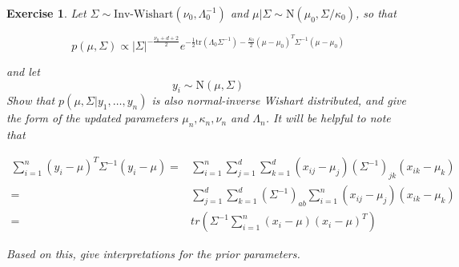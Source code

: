 \documentclass[twoside]{article}
\newcounter{lecnum}
\newtheorem{exercise}{Exercise}[lecnum]
\begin{document}
\begin{exercise}
  Let $\Sigma \sim \mbox{Inv-Wishart}(\nu_0, \Lambda_0^{-1})$ and $\mu|\Sigma \sim \mbox{N}(\mu_0, \Sigma/\kappa_0)$, so that

  $$p(\mu,\Sigma) \propto |\Sigma|^{-\frac{\nu_0+d+2}{2}}e^{-\frac{1}{2}\mbox{tr}(\Lambda_0\Sigma^{-1}) - \frac{\kappa_0}{2}(\mu-\mu_0)^T\Sigma^{-1}(\mu-\mu_0)}$$

  and let
  $$y_i \sim \mbox{N}(\mu, \Sigma)$$
  Show that $p(\mu, \Sigma|y_1,\dots,y_n)$ is also normal-inverse Wishart distributed, and give the form of the updated parameters $\mu_n, \kappa_n, \nu_n$ and $\Lambda_n$. It will be helpful to note that

  $$\begin{aligned}\sum_{i=1}^n(y_i-\mu)^T\Sigma^{-1}(y_i-\mu) =& \sum_{i=1}^n\sum_{j=1}^d\sum_{k=1}^d(x_{ij}-\mu_j)(\Sigma^{-1})_{jk}(x_{ik}-\mu_k)\\
    =& \sum_{j=1}^d\sum_{k=1}^d (\Sigma^{-1})_{ab}\sum_{i=1}^n(x_{ij}-\mu_j)(x_{ik}-\mu_k)\\
    =& tr\left(\Sigma^{-1}\sum_{i=1}^n(x_i-\mu)(x_i-\mu)^T\right)\end{aligned}$$
  
  Based on this, give interpretations for the prior parameters.
\end{exercise}
\end{document}
